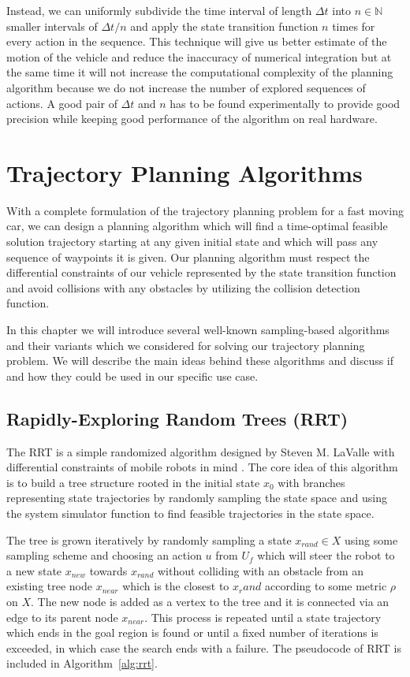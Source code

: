 Instead, we can uniformly subdivide the time interval of length $\Delta t$ into $n\in\mathbb{N}$ smaller intervals of $\Delta t/n$ and apply the state transition function $n$ times for every action in the sequence. This technique will give us better estimate of the motion of the vehicle and reduce the inaccuracy of numerical integration but at the same time it will not increase the computational complexity of the planning algorithm because we do not increase the number of explored sequences of actions. A good pair of $\Delta t$ and $n$ has to be found experimentally to provide good precision while keeping good performance of the algorithm on real hardware.

\section{Trajectory Planning Algorithms}
\label{sec:trajectory_planning_algorithms}

With a complete formulation of the trajectory planning problem for a fast moving car, we can design a planning algorithm which will find a time-optimal feasible solution trajectory starting at any given initial state and which will pass any sequence of waypoints it is given. Our planning algorithm must respect the differential constraints of our vehicle represented by the state transition function and avoid collisions with any obstacles by utilizing the collision detection function.

In this chapter we will introduce several well-known sampling-based algorithms and their variants which we considered for solving our trajectory planning problem. We will describe the main ideas behind these algorithms and discuss if and how they could be used in our specific use case.

\subsection{Rapidly-Exploring Random Trees (RRT)}

The \gls{RRT} is a simple randomized algorithm designed by Steven M. LaValle with differential constraints of mobile robots in mind \cite{RRT}. The core idea of this algorithm is to build a tree structure rooted in the initial state $x_0$ with branches representing state trajectories by randomly sampling the state space and using the system simulator function to find feasible trajectories in the state space.

The tree is grown iteratively by randomly sampling a state $x_{rand}\in X$ using some sampling scheme and choosing an action $u$ from $U_f$ which will steer the robot to a new state $x_{new}$ towards $x_{rand}$ without colliding with an obstacle from an existing tree node $x_{near}$ which is the closest to $x_rand$ according to some metric $\rho$ on $X$. The new node is added as a vertex to the tree and it is connected via an edge to its parent node $x_{near}$. This process is repeated until a state trajectory which ends in the goal region is found or until a fixed number of iterations is exceeded, in which case the search ends with a failure. The pseudocode of RRT is included in Algorithm~\ref{alg:rrt}.

